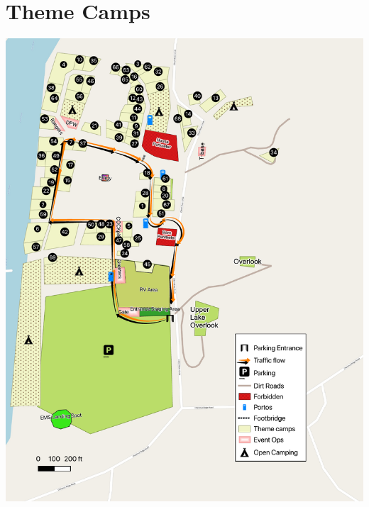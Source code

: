 \section*{Theme Camps}
\vspace*{\fill}
\begin{center}
	\includegraphics[width=.95\textwidth]{images/TTM2019Pocket}
\end{center}
\vspace*{\fill}